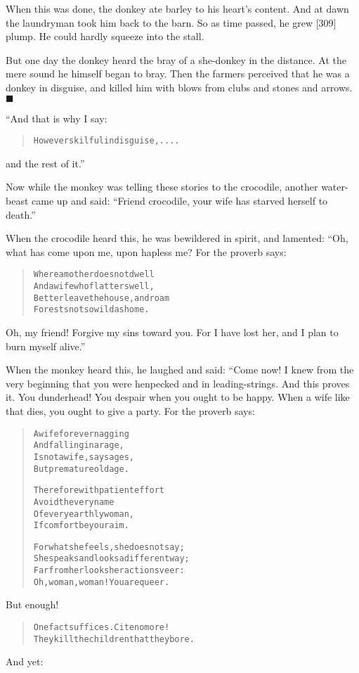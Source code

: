 \documentclass[article, twoside, 14pt]{memoir}
\newcommand{\qed}{\hfill \ensuremath{\blacksquare}}
\renewenvironment{verbatim}{%
\begin{quote}%
\vskip -10pt%
\begin{alltt}\normalfont\large}{\end{alltt}%
\end{quote}%
\vskip -10pt
} %
\begin{document}
When this was done, the donkey ate barley to his heart's content.
And at dawn the laundryman took him back to the barn. So as time
passed, he grew [309] plump. He could hardly squeeze into the
stall.

But one day the donkey heard the bray of a she-donkey in the
distance. At the mere sound he himself began to bray. Then the
farmers perceived that he was a donkey in disguise, and killed him
with blows from clubs and stones and arrows.\hyperref[s73]{\qed}

“And that is why I say:

\begin{verbatim}
However skilful in disguise, ....
\end{verbatim}
and the rest of it.”

Now while the monkey was telling these stories to the crocodile,
another water-beast came up and said:
``Friend crocodile, your wife has starved herself to death.''

When the crocodile heard this, he was bewildered in spirit, and
lamented: “Oh, what has come upon me, upon hapless me? For the
proverb says:

\begin{verbatim}
Where a mother does not dwell
And a wife who flatters well,
Better leave the house, and roam
Forests not so wild as home.
\end{verbatim}
Oh, my friend! Forgive my sins toward you. For I have lost her, and
I plan to burn myself alive.”

When the monkey heard this, he laughed and said: “Come now! I knew
from the very beginning that you were henpecked and in
leading-strings. And this proves it. You dunderhead! You despair
when you ought to be happy. When a wife like that dies, you ought
to give a party. For the proverb says:

\begin{verbatim}
A wife forever nagging
    And falling in a rage,
Is not a wife, say sages,
    But premature old age.

Therefore with patient effort
    Avoid the very name
Of every earthly woman,
    If comfort be your aim.

For what she feels, she does not say;
She speaks and looks a different way;
Far from her looks her actions veer:
Oh, woman, woman! You are queer.
\end{verbatim}
But enough!

\begin{verbatim}
One fact suffices. Cite no more!
They kill the children that they bore.
\end{verbatim}
And yet:
\end{document}
